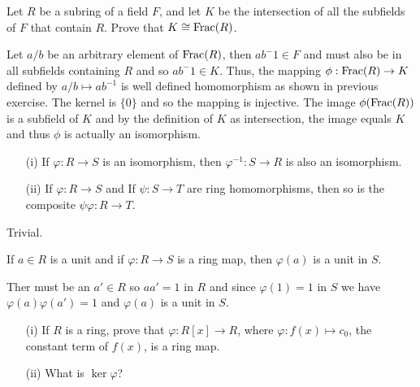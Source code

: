 \begin{myenumerate}
\item
\begin{excopy}
Let $R$ be a subring of a field $F$, and let  $K$ be the intersection
of all the subfields of $F$ that contain $R$.
Prove that \(K\cong \mathop{\rm Frac}\nolimits(R)\).
\end{excopy}

Let \(a/b\) be an arbitrary element of \(\mathop{\rm Frac}\nolimits(R)\),
then \(ab^-1\in F\) and must also be in all subfields containing $R$
and so \(ab^-1\in K\). Thus, the mapping
\(\phi:\mathop{\rm Frac}\nolimits(R) \rightarrow  K\) defined by
\(a/b\mapsto ab^{-1}\) is well defined homomorphism
as shown in previous exercise.
The kernel is \(\{0\}\) and so the mapping is injective.
The image \(\phi(\mathop{\rm Frac}\nolimits(R))\) is a subfield of $K$ and by
the definition of $K$ as intersection, the image equals $K$
and thus \(\phi\) is actually an isomorphism.

\item
\begin{excopy}
\begin{itemize}
 \item[(i)]
   If \(\varphi: R \rightarrow S\) is an isomorphism, then
   \(\varphi^{-1}: S \rightarrow R\) is also an isomorphism.
 \item[(ii)]
   If \(\varphi: R \rightarrow S\) and
   If \(\psi: S \rightarrow T\) are ring  homomorphisms, then so is
   the composite \(\psi\varphi: R \rightarrow T\).
\end{itemize}
\end{excopy}

Trivial.

\item
\begin{excopy}
If \(a\in R\) is a unit and if
\(\varphi: R \rightarrow S\) is a ring map, then \(\varphi(a)\)
is a unit in $S$.
\end{excopy}

Ther must be an \(a'\in R\) so \(aa'=1\) in $R$ and since
\(\varphi(1)=1\) in $S$ we have \(\varphi(a)\varphi(a')=1\)
and  \(\varphi(a)\) is a unit in $S$.


\item
\begin{excopy}
\begin{itemize}
 \item[(i)]
   If $R$ is a ring, prove that \(\varphi: R[x]\rightarrow R\),
   where \(\varphi: f(x) \mapsto c_0\), the constant term of \(f(x)\),
   is a ring map.
 \item[(ii)]
   What is \(\ker\varphi\)?
\end{itemize}
\end{excopy}


\end{myenumerate}
